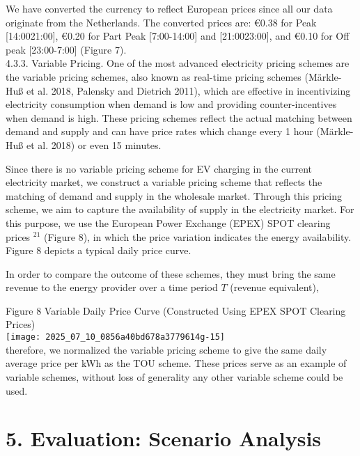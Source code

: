 \documentclass[10pt]{article}
\begin{document}
We have converted the currency to reflect European prices since all our data originate from the Netherlands. The converted prices are: €0.38 for Peak [14:0021:00], €0.20 for Part Peak [7:00-14:00] and [21:0023:00], and €0.10 for Off peak [23:00-7:00] (Figure 7).\\
4.3.3. Variable Pricing. One of the most advanced electricity pricing schemes are the variable pricing schemes, also known as real-time pricing schemes (Märkle-Huß et al. 2018, Palensky and Dietrich 2011), which are effective in incentivizing electricity consumption when demand is low and providing counter-incentives when demand is high. These pricing schemes reflect the actual matching between demand and supply and can have price rates which change every 1 hour (Märkle-Huß et al. 2018) or even 15 minutes.

Since there is no variable pricing scheme for EV charging in the current electricity market, we construct a variable pricing scheme that reflects the matching of demand and supply in the wholesale market. Through this pricing scheme, we aim to capture the availability of supply in the electricity market. For this purpose, we use the European Power Exchange (EPEX) SPOT clearing prices ${ }^{21}$ (Figure 8), in which the price variation indicates the energy availability. Figure 8 depicts a typical daily price curve.

In order to compare the outcome of these schemes, they must bring the same revenue to the energy provider over a time period $T$ (revenue equivalent),

Figure 8 Variable Daily Price Curve (Constructed Using EPEX SPOT Clearing Prices)\\
\texttt{[image: 2025\_07\_10\_0856a40bd678a3779614g-15]}\\
therefore, we normalized the variable pricing scheme to give the same daily average price per kWh as the TOU scheme. These prices serve as an example of variable schemes, without loss of generality any other variable scheme could be used.

\section*{5. Evaluation: Scenario Analysis}
\end{document}
